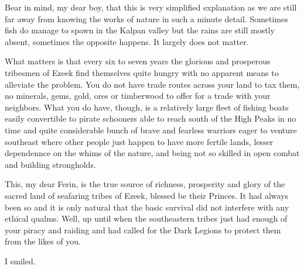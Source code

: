 {Bear in mind, my dear boy, that this is very simplified explanation as we are still far away from knowing the works of nature in such a minute detail. Sometimes fish do manage to spawn in the Kalpan valley but the rains are still mostly absent, sometimes the opposite happens. It largely does not matter.

What matters is that every six to seven years the glorious and prosperous tribesmen of Ezeek find themselves quite hungry with no apparent means to alleviate the problem. You do not have trade routes across your land to tax them, no minerals, gems, gold, ores or timberwood to offer for a trade with your neighbors. What you do have, though, is a relatively large fleet of fishing boats easily convertible to pirate schooners able to reach south of the High Peaks in no time and quite considerable bunch of brave and fearless warriors eager to venture southeast where other people just happen to have more fertile lands, lesser dependennce on the whims of the nature, and being not so skilled in open combat and building strongholds.

This, my dear Ferin, is the true source of richness, prosperity and glory of the sacred land of seafaring tribes of Ezeek, blessed be their Princes. It had always been so and it is only natural that the basic survival did not interfere with any ethical qualms. Well, up until when the southeastern tribes just had enough of your piracy and raiding and had called for the Dark Legions to protect them from the likes of you.}


I smiled.

